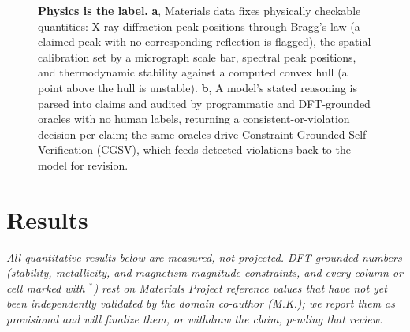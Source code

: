 \documentclass[pdflatex,sn-nature]{sn-jnl}
\begin{document}
\begin{figure}[t]
{}
\caption{\textbf{Physics is the label.} \textbf{a}, Materials data fixes physically checkable quantities: X-ray diffraction peak positions through Bragg's law (a claimed peak with no corresponding reflection is flagged), the spatial calibration set by a micrograph scale bar, spectral peak positions, and thermodynamic stability against a computed convex hull (a point above the hull is unstable). \textbf{b}, A model's stated reasoning is parsed into claims and audited by programmatic and DFT-grounded oracles with no human labels, returning a consistent-or-violation decision per claim; the same oracles drive Constraint-Grounded Self-Verification (CGSV), which feeds detected violations back to the model for revision.}
\label{fig:teaser}
\end{figure}

\section*{Results}
\emph{All quantitative results below are measured, not projected. DFT-grounded
numbers (stability, metallicity, and magnetism-magnitude constraints, and every column or
cell marked with $^{*}$) rest on Materials Project reference values that have not yet
been independently validated by the domain co-author (M.K.); we report them as
provisional and will finalize them, or withdraw the claim, pending that review.}
\end{document}
